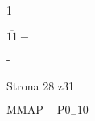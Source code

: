 \documentclass[a4paper,12pt]{article}
\begin{document}
1

$\overline{11}-$

-

Strona 28 z31

$\mathrm{M}\mathrm{M}\mathrm{A}\mathrm{P}-\mathrm{P}0_{-}10$
\end{document}
